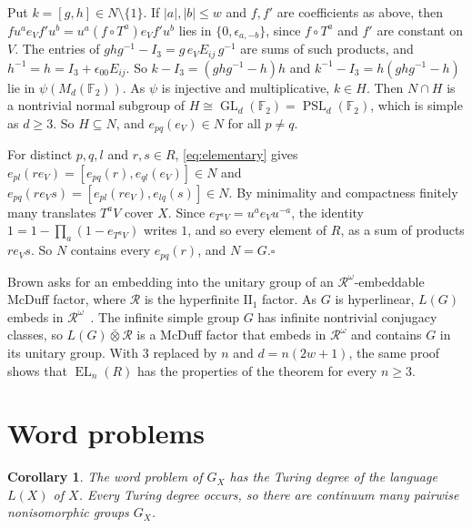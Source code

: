 \documentclass[11pt]{amsart}
\newtheorem{corollary}[theorem]{Corollary}
\newcommand{\F}{\mathbb F}
\newcommand{\EL}{\operatorname{EL}}
\newcommand{\GL}{\operatorname{GL}}
\newcommand{\PSL}{\operatorname{PSL}}
\begin{document}
Put $k=[g,h]\in N\setminus\{1\}$. If $|a|,|b|\le w$ and $f,f'$ are
coefficients as above, then $fu^ae_Vf'u^b=u^a(f\circ T^a)e_Vf'u^b$ lies
in $\{0,\epsilon_{a,-b}\}$, since $f\circ T^a$ and $f'$ are constant on
$V$. The entries of $ghg^{-1}-I_3=g\,e_VE_{ij}\,g^{-1}$ are sums of such
products, and $h^{-1}=h=I_3+\epsilon_{00}E_{ij}$. So
$k-I_3=(ghg^{-1}-h)h$ and $k^{-1}-I_3=h(ghg^{-1}-h)$ lie in
$\psi(M_d(\F_2))$. As $\psi$ is injective and multiplicative, $k\in H$.
Then $N\cap H$ is a nontrivial normal subgroup of
$H\cong\GL_d(\F_2)=\PSL_d(\F_2)$, which is simple as $d\ge3$. So
$H\subseteq N$, and $e_{pq}(e_V)\in N$ for all $p\ne q$.

For distinct $p,q,l$ and $r,s\in R$, \eqref{eq:elementary} gives
$e_{pl}(re_V)=[e_{pq}(r),e_{ql}(e_V)]\in N$ and
$e_{pq}(re_Vs)=[e_{pl}(re_V),e_{lq}(s)]\in N$. By minimality and
compactness finitely many translates $T^aV$ cover $X$. Since
$e_{T^aV}=u^ae_Vu^{-a}$, the identity $1=1-\prod_a(1-e_{T^aV})$ writes
$1$, and so every element of $R$, as a sum of products $re_Vs$. So $N$
contains every $e_{pq}(r)$, and $N=G$.\hfill$\square$

Brown asks for an embedding into the unitary group of an
$\mathcal R^\omega$-embeddable McDuff factor, where $\mathcal R$ is the
hyperfinite $\mathrm{II}_1$ factor. As $G$ is hyperlinear, $L(G)$ embeds
in $\mathcal R^\omega$~\cite[Proposition~7.1]{Ozawa}. The infinite simple
group $G$ has infinite nontrivial conjugacy classes, so
$L(G)\mathbin{\bar\otimes}\mathcal R$ is a McDuff factor that embeds in
$\mathcal R^\omega$ and contains $G$ in its unitary group. With $3$
replaced by $n$ and $d=n(2w+1)$, the same proof shows that $\EL_n(R)$
has the properties of the theorem for every $n\ge3$.

\section{Word problems}

\begin{corollary}
The word problem of $G_X$ has the Turing degree of the language $L(X)$
of $X$. Every Turing degree occurs, so there are continuum many pairwise
nonisomorphic groups $G_X$.
\end{corollary}
\end{document}
